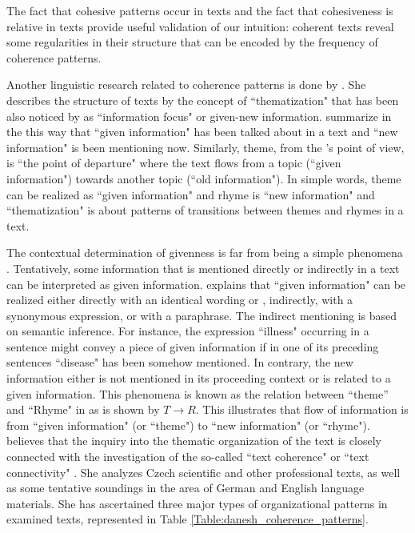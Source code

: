 The fact that cohesive patterns occur in texts and the fact that cohesiveness is relative in texts provide useful validation of our intuition: coherent texts reveal some regularities in their structure that can be encoded by the frequency of coherence patterns. 

Another linguistic research related to coherence patterns is done by . 
She describes the structure of texts by the concept  of ``thematization" that has been also noticed by  as ``information focus" or given-new information. 
 summarize in the this way that ``given information" has been talked about in a text and ``new information" is been mentioning now.  
Similarly, theme, from the 's point of view, is ``the point of departure" where the text flows from a topic (``given information") towards another topic (``old information"). 
In simple words, theme can be realized as ``given information" and rhyme is ``new information" and ``thematization"  is about  patterns of transitions between themes and rhymes in a text. 

The contextual determination of givenness is far from being a simple phenomena \cite{danes74a}. 
Tentatively, some information that is mentioned directly or indirectly in a text can be interpreted as given information. 
 explains that ``given information" can be realized either directly with an identical wording or , indirectly, with a synonymous expression, or with a paraphrase. 
The indirect mentioning is based on semantic inference. 
For instance, the expression ``illness" occurring in a sentence might convey a piece of given information if in one of its preceding sentences ``disease" has been somehow mentioned. 
In contrary, the new information either is not mentioned in its proceeding context or is related to a given information. 
This phenomena is known as the relation between ``theme'' and ``Rhyme" in  as is shown by  $T \rightarrow R$. 
This illustrates that flow of information is from ``given information" (or ``theme") to ``new information" (or ``rhyme").
 believes that the inquiry into the thematic organization of the text is closely connected with the investigation of the so-called ``text coherence" or ``text connectivity" .
She analyzes Czech scientific and other professional texts, as well as some tentative soundings in the area of German and English language materials.
She has ascertained  three major types of organizational patterns in examined texts, represented in Table \ref{Table:danesh_coherence_patterns}. 


